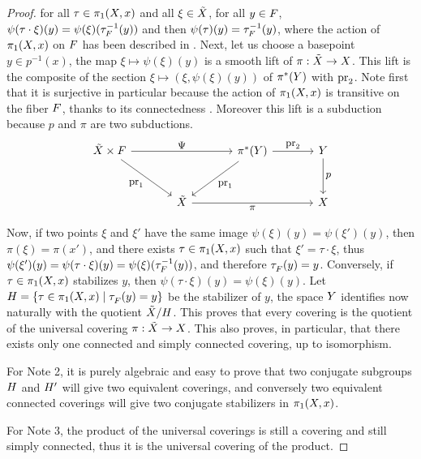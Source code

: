 \begin{proof}
  for all $\tau \in \pi_1(X,x)$ and all $\xi \in \tilde {X}$,
  for all $y \in F$,
  $\psi(\tau \cdot \xi) (y) = \psi(\xi)(\tau^{-1}_F(y))$ and then $\psi(\tau)(y) = \tau^{-1}_F(y)$,
  where the action of $\pi_1(X,x)$ on $F$ has been described in .
  Next,
  let us choose a basepoint $y \in p^{-1}(x)$,
  the map $\xi \mapsto \psi(\xi)(y)$ is a smooth lift of $\pi : \tilde{X} \to X$.
  This lift is the composite of the section $\xi \mapsto (\xi, \psi(\xi)(y))$ of $\pi^*(Y)$ with $\mathrm{pr}_2$.
  Note first that it is surjective in particular because the action of $\pi_1(X,x)$ is transitive on the fiber $F$,
  thanks to its connectedness .
  Moreover this lift is a subduction because $p$ and $\pi$ are two subductions.
  \begin{equation}
    \renewcommand{\theequation}{$\clubsuit$}
    \begin{tikzcd}[column sep=large, row sep=large, every label/.append style = {font = \small}]
      \tilde\X \times \F \arrow[rr,"\Psi"] \arrow[dr, swap, "\pr_1"] & {} & \pi^*(\Y) \arrow[r,"\pr_2"] \arrow[dl, "\pr_1"] & \Y \arrow[d,"p"]  \\
      {}  & \tilde\X \arrow[rr, swap, "\pi"] & {} & \X
    \end{tikzcd}
  \end{equation}

  Now,
  if two points $\xi$ and $\xi'$
  have the same image $\psi(\xi)(y) = \psi(\xi')(y)$,
  then $\pi(\xi) = \pi(x')$,
  and there exists $\tau \in \pi_1(X,x)$ such that $\xi'= \tau \cdot \xi$,
  thus $\psi(\xi')(y) = \psi(\tau \cdot \xi)(y) = \psi(\xi)(\tau^{-1}_F(y))$,
  and therefore $\vartau_\F(y) = y$.
  Conversely,
  if $\tau \in \pi_1(X,x)$ stabilizes $y$,
  then $\psi(\tau \cdot \xi)(y) =  \psi(\xi)(y)$.
  Let $\H = \{ \tau \in \pi_1(\X,x) \mid \vartau_\F(y) = y\}$ be the stabilizer of $y$,
  the space $Y$ identifies now naturally with the quotient $\tilde {X}/H$.
  This proves that every covering is the quotient of the universal covering $\pi : \tilde {X} \to X$.
  This also proves,
  in particular,
  that there exists only one connected and simply connected covering,
  up to isomorphism.
  
  For Note 2,
  it is purely algebraic and easy to prove that two conjugate
  subgroups $H$ and $H'$ will give two equivalent coverings,
  and conversely two equivalent connected coverings will give two conjugate stabilizers in $\pi_1(X,x)$.
  
  For Note 3, the product of the universal coverings is still a covering and still simply connected,
  thus it is the universal covering of the product.
\end{proof}

